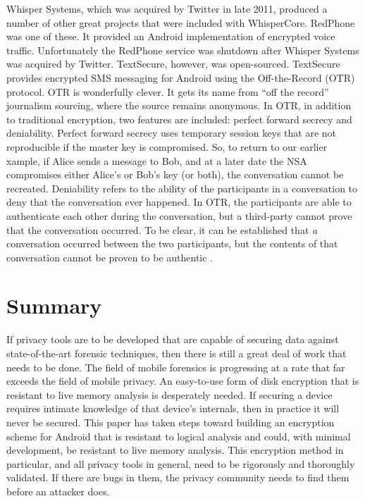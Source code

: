 Whisper Systems, which was acquired by Twitter in late 2011, produced a number of other great projects that were included with
WhisperCore. RedPhone was one of these. It provided an Android implementation of encrypted voice traffic.  Unfortunately the
RedPhone service was shutdown after Whisper Systems was acquired by Twitter. TextSecure, however, was open-sourced. TextSecure
provides encrypted SMS messaging for Android using the Off-the-Record (OTR) protocol. OTR is wonderfully clever. It gets its name
from ``off the record'' journalism sourcing, where the source remains anonymous. In OTR, in addition to traditional encryption, two
features are included: perfect forward secrecy and deniability. Perfect forward secrecy uses temporary session keys that are not
reproducible if the master key is compromised. So, to return to our earlier xample, if Alice sends a message to Bob, and at a later
date the NSA compromises either Alice's or Bob's key (or both), the conversation cannot be recreated.  Deniability refers to the
ability of the participants in a conversation to deny that the conversation ever happened. In OTR, the participants are able to
authenticate each other during the conversation, but a third-party cannot prove that the conversation occurred. To be clear, it can
be established that \emph{a} conversation occurred between the two participants, but the contents of that conversation cannot be
proven to be authentic \cite{otr}.


\section{Summary}

If privacy tools are to be developed that are capable of securing data against state-of-the-art forensic techniques, then there is
still a great deal of work that needs to be done. The field of mobile forensics is progressing at a rate that far exceeds the
field of mobile privacy. An easy-to-use form of disk encryption that is resistant to live memory analysis is desperately needed.  If
securing a device requires intimate knowledge of that device's internals, then in practice it will never be secured. This paper has
taken steps toward building an encryption scheme for Android that is resistant to logical analysis and could, with minimal
development, be resistant to live memory analysis. This encryption method in particular, and all privacy tools in general, need to
be rigorously and thoroughly validated. If there are bugs in them, the privacy community needs to find them before an attacker does.
